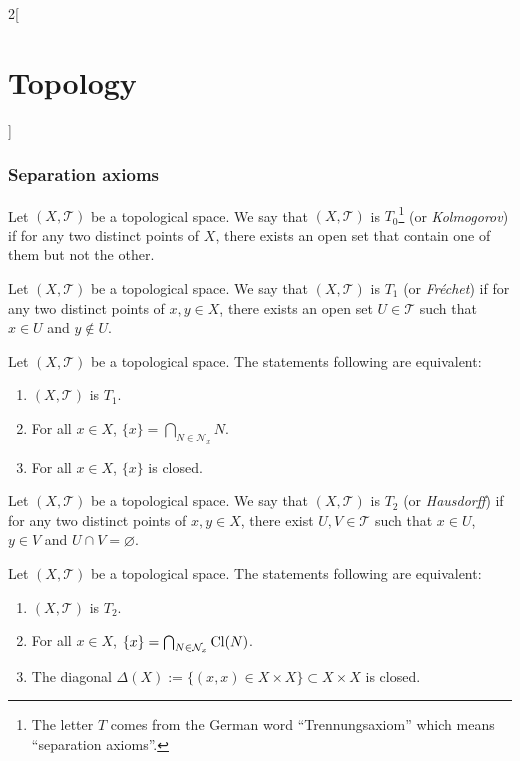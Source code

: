 \documentclass[../../../main.tex]{subfiles}
\begin{document}
\begin{multicols}{2}[\section{Topology}]
  \subsubsection{Separation axioms}
  \begin{definition}[$T_0$ space]
    Let $(X,\mathcal{T})$ be a topological space. We say that $(X,\mathcal{T})$ is $T_0$\footnote{The letter $T$ comes from the German word ``Trennungsaxiom'' which means ``separation axioms''.} (or \textit{Kolmogorov}) if for any two distinct points of $X$, there exists an open set that contain one of them but not the other.
  \end{definition}
  \begin{definition}[$T_1$ space]
    Let $(X,\mathcal{T})$ be a topological space. We say that $(X,\mathcal{T})$ is $T_1$ (or \textit{Fréchet}) if for any two distinct points of $x,y\in X$, there exists an open set $U\in\mathcal{T}$ such that $x\in U$ and $y\notin U$.
  \end{definition}
  \begin{theorem}
    Let $(X,\mathcal{T})$ be a topological space. The statements following are equivalent:
    \begin{enumerate}
      \item $(X,\mathcal{T})$ is $T_1$.
      \item For all $x\in X$, $\{x\}=\bigcap_{N\in \mathcal{N}_x}N$.
      \item For all $x\in X$, $\{x\}$ is closed.
    \end{enumerate}
  \end{theorem}
  \begin{definition}[$T_2$ space]
    Let $(X,\mathcal{T})$ be a topological space. We say that $(X,\mathcal{T})$ is $T_2$ (or \textit{Hausdorff}) if for any two distinct points of $x,y\in X$, there exist $U,V\in\mathcal{T}$ such that $x\in U$, $y\in V$ and $U\cap V=\varnothing$.
  \end{definition}
  \begin{theorem}
    Let $(X,\mathcal{T})$ be a topological space. The statements following are equivalent:
    \begin{enumerate}
      \item $(X,\mathcal{T})$ is $T_2$.
      \item For all $x\in X$, $\{x\}=\bigcap_{N\in \mathcal{N}_x}\operatorname{Cl}(N)$.
      \item The diagonal $\Delta(X):=\{(x,x)\in X\times X\}\subset X\times X$ is closed.
    \end{enumerate}

\end{theorem}
\end{multicols}
\end{document}
